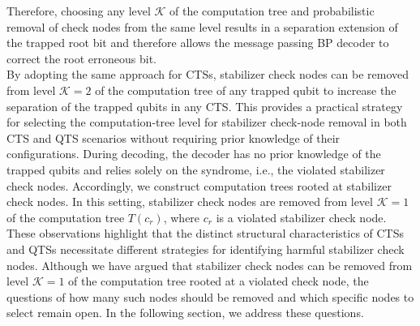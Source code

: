 \documentclass[%
 reprint,
 amsmath,amssymb,
 aps,
pra,
showkeys,
]{revtex4-2}
\begin{document}
Therefore, choosing any level $\mathcal{K}$ of the computation tree and probabilistic removal of check nodes from the same level results in a separation extension of the trapped root bit and therefore allows the message passing BP decoder to correct the root erroneous bit.\\
By adopting the same approach for CTSs, stabilizer check nodes can be removed from level $\mathcal{K} = 2$ of the computation tree of any trapped qubit to increase the separation of the trapped qubits in any CTS. 
This provides a practical strategy for selecting the computation-tree level for stabilizer check-node removal in both CTS and QTS scenarios without requiring prior knowledge of their configurations.
During decoding, the decoder has no prior knowledge of the trapped qubits and relies solely on the syndrome, i.e., the violated stabilizer check nodes. Accordingly, we construct computation trees rooted at stabilizer check nodes. In this setting, stabilizer check nodes are removed from level $\mathcal{K} = 1$ of the computation tree $T(c_r)$, where $c_r$ is a violated stabilizer check node.
These observations highlight that the distinct structural characteristics of CTSs and QTSs necessitate different strategies for identifying harmful stabilizer check nodes.
Although we have argued that stabilizer check nodes can be removed from level $\mathcal{K} = 1$ of the computation tree rooted at a violated check node, the questions of how many such nodes should be removed and which specific nodes to select remain open. 
In the following section, we address these questions.
\end{document}
